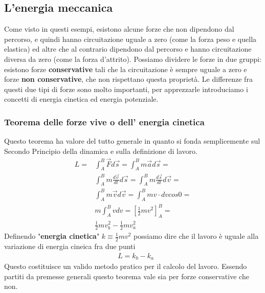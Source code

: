 \documentclass[10pt,a4paper]{article}
\begin{document}
\subsection{L'energia meccanica}
Come visto in questi esempi, esistono alcune forze che non dipendono dal percorso, e quindi hanno circuitazione uguale a zero (come la forza peso e quella elastica) ed altre che al contrario dipendono dal percorso e hanno circuitazione diversa da zero (come la forza d'attrito). Possiamo dividere le forze in due gruppi: esistono forze \textbf{conservative} tali che la circuitazione è sempre uguale a zero e forze \textbf{non conservative}, che non rispettano questa proprietà. Le differenze fra questi due tipi di forze sono molto importanti, per apprezzarle introduciamo i concetti di energia cinetica ed energia potenziale.
\subsubsection{Teorema delle forze vive o dell' energia cinetica}
Questo teorema ha valore del tutto generale in quanto si fonda semplicemente sul Secondo Principio della dinamica e sulla definizione di lavoro.
\begin{align*}
	L =& \int_{A}^{B}\vec{F} d\vec{s}= \int_{A}^{B}m\vec{a} d\vec{s}=\\
	&\int_{A}^{B}m\frac{d\vec{v}}{dt} d\vec{s}=\int_{A}^{B}m\frac{d\vec{s}}{dt} d\vec{v}=\\
	&\int_{A}^{B}m\vec{v} d\vec{v}=\int_{A}^{B}m v\cdot dv cos0=\\
	&m\int_{A}^{B} v dv=[\frac{1}{2}mv^2]_{A}^{B}=\\
	&\frac{1}{2}mv_b^2-\frac{1}{2}mv_a^2
\end{align*}
Definendo "\textbf{energia cinetica}" $k \equiv \frac{1}{2}mv^2$ possiamo dire che il lavoro è uguale alla variazione di energia cineica fra due punti
\begin{align*}
	&L = k_b -k_a
\end{align*}
Questo costituisce un valido metodo pratico per il calcolo del lavoro. Essendo partiti da premesse generali questo teorema vale sia per forze conservative che non.
\end{document}
